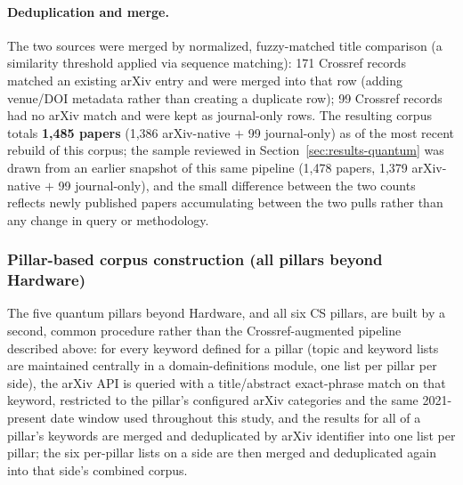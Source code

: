 \documentclass[11pt]{article}
\begin{document}
\paragraph{Deduplication and merge.} The two sources were merged by normalized,
fuzzy-matched title comparison (a similarity threshold applied via sequence matching):
171 Crossref records matched an existing arXiv entry and were merged into that row
(adding venue/DOI metadata rather than creating a duplicate row); 99 Crossref records
had no arXiv match and were kept as journal-only rows. The resulting corpus totals
\textbf{1{,}485 papers} (1{,}386 arXiv-native $+$ 99 journal-only) as of the most recent
rebuild of this corpus; the sample reviewed in Section~\ref{sec:results-quantum} was
drawn from an earlier snapshot of this same pipeline (1{,}478 papers, 1{,}379
arXiv-native $+$ 99 journal-only), and the small difference between the two counts
reflects newly published papers accumulating between the two pulls rather than any
change in query or methodology.

\subsubsection{Pillar-based corpus construction (all pillars beyond Hardware)}
\label{sec:pillar-corpus-construction}

The five quantum pillars beyond Hardware, and all six CS pillars, are built by a
second, common procedure rather than the Crossref-augmented pipeline described above:
for every keyword defined for a pillar (topic and keyword lists are maintained
centrally in a domain-definitions module, one list per pillar per side), the arXiv API
is queried with a title/abstract exact-phrase match on that keyword, restricted to the
pillar's configured arXiv categories and the same 2021-present date window used
throughout this study, and the results for all of a pillar's keywords are merged and
deduplicated by arXiv identifier into one list per pillar; the six per-pillar lists on
a side are then merged and deduplicated again into that side's combined corpus.
\end{document}
